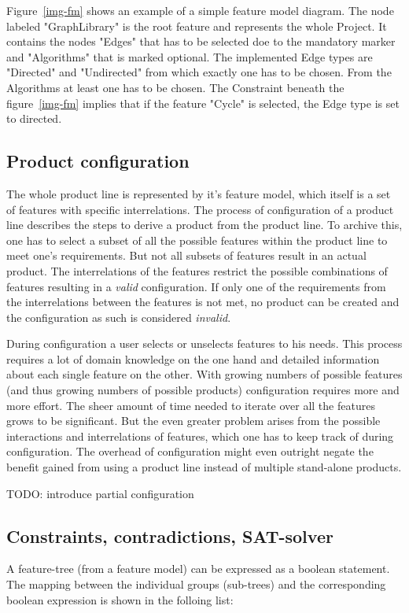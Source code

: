 Figure~\ref{img-fm} shows an example of a simple feature model diagram. The node labeled "GraphLibrary" is the root feature and represents the whole Project. It contains the nodes "Edges" that has to be selected doe to the mandatory marker and "Algorithms" that is marked optional. The implemented Edge types are "Directed" and "Undirected" from which exactly one has to be chosen. From the Algorithms at least one has to be chosen. The Constraint beneath the figure~\ref{img-fm} implies that if the feature "Cycle" is selected, the Edge type is set to directed.

\subsection{Product configuration}
The whole product line is represented by it's feature model, which itself is a set of features with specific interrelations. The process of configuration of a product line describes the steps to derive a product from the product line. To archive this, one has to select a subset of all the possible features within the product line to meet one's requirements. But not all subsets of features result in an actual product. The interrelations of the features restrict the possible combinations of features resulting in a \textit{valid} configuration. If only one of the requirements from the interrelations between the features is not met, no product can be created and the configuration as such is considered \textit{invalid}.

During configuration a user selects or unselects features to his needs. This process requires a lot of domain knowledge on the one hand and detailed information about each single feature on the other. With growing numbers of possible features (and thus growing numbers of possible products) configuration requires more and more effort. The sheer amount of time needed to iterate over all the features grows to be significant. But the even greater problem arises from the possible interactions and interrelations of features, which one has to keep track of during configuration. The overhead of configuration might even outright negate the benefit gained from using a product line instead of multiple stand-alone products.

{\color{red}TODO: introduce partial configuration}

\subsection{Constraints, contradictions, SAT-solver}
A feature-tree (from a feature model) can be expressed as a boolean statement. The mapping between the individual groups (sub-trees) and the corresponding boolean expression is shown in the folloing list:

